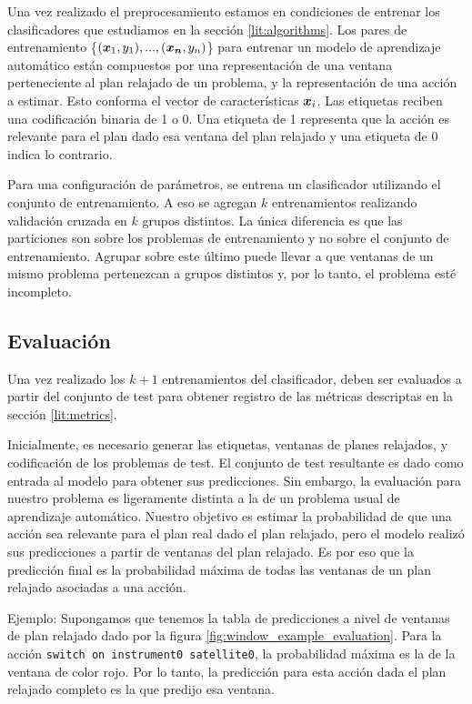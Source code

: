Una vez realizado el preprocesamiento estamos en condiciones de entrenar los
clasificadores que estudiamos en la sección \ref{lit:algorithms}. Los pares de
entrenamiento \{$(\boldsymbol{x}_1, y_1), ..., (\boldsymbol{x_n}, y_n)$\} para entrenar un
modelo de aprendizaje automático están compuestos por una representación de una
ventana perteneciente al plan relajado de un problema, y la representación de
una acción a estimar. Esto conforma el vector de características $\boldsymbol{x}_i$.
Las etiquetas reciben una codificación binaria de 1 o 0. Una etiqueta de 1
representa que la acción es relevante para el plan dado esa ventana del plan
relajado y una etiqueta de 0 indica lo contrario.

Para una configuración de parámetros, se entrena un clasificador utilizando
el conjunto de entrenamiento. A eso se agregan $k$ entrenamientos realizando
validación cruzada en $k$ grupos distintos. La única diferencia es que las
particiones son sobre los problemas de entrenamiento y no sobre el conjunto de
entrenamiento. Agrupar sobre este último puede llevar a que ventanas de un mismo
problema pertenezcan a grupos distintos y, por lo tanto, el problema esté
incompleto.

\subsection{Evaluación}

Una vez realizado los $k + 1$ entrenamientos del clasificador, deben ser
evaluados a partir del conjunto de test para obtener registro de las métricas
descriptas en la sección \ref{lit:metrics}. 

Inicialmente, es necesario generar las etiquetas, ventanas de planes relajados, y
codificación de los problemas de test. El conjunto de test resultante es dado
como entrada al modelo para obtener sus predicciones. Sin embargo, la evaluación
para nuestro problema es ligeramente distinta a la de un problema usual de
aprendizaje automático. Nuestro objetivo es estimar la probabilidad de que una
acción sea relevante para el plan real dado el plan relajado, pero el modelo
realizó sus predicciones a partir de ventanas del plan relajado. Es por eso que
la predicción final es la probabilidad máxima de todas las ventanas de un plan
relajado asociadas a una acción.

Ejemplo: Supongamos que tenemos la tabla de predicciones a nivel de ventanas de
plan relajado dado por la figura \ref{fig:window_example_evaluation}. Para la acción
\verb|switch on instrument0 satellite0|, la probabilidad máxima es la de la
ventana de color rojo. Por lo tanto, la predicción para esta acción dada el plan
relajado completo es la que predijo esa ventana.


